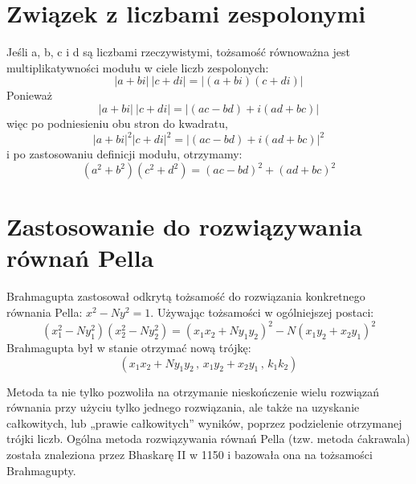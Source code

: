 \documentclass{article}
\begin{document}
\section*{Związek z liczbami zespolonymi}
Jeśli a, b, c i d są liczbami rzeczywistymi, tożsamość równoważna jest multiplikatywności modułu w ciele liczb zespolonych:
$$ |a+bi|\ |c+di|=|(a+bi)(c+di)| $$
Ponieważ
$$  |a+bi|\ |c+di|=|(ac-bd)+i(ad+bc)| $$
więc po podniesieniu obu stron do kwadratu,
$$ |a+bi|^{2}|c+di|^{2}=|(ac-bd)+i(ad+bc)|^{2} $$
i po zastosowaniu definicji modułu, otrzymamy: 
$$ (a^{2}+b^{2})(c^{2}+d^{2})=(ac-bd)^{2}+(ad+bc)^{2} $$

\section*{Zastosowanie do rozwiązywania równań Pella}
Brahmagupta zastosował odkrytą tożsamość do rozwiązania konkretnego równania Pella: $ x^{2}-Ny^{2}=1 $. Używając tożsamości w ogólniejszej postaci:
\[ (x_{1}^{2}-Ny_{1}^{2})(x_{2}^{2}-Ny_{2}^{2})=(x_{1}x_{2}+Ny_{1}y_{2})^{2}-N(x_{1}y_{2}+x_{2}y_{1})^{2} \]
Brahmagupta był w stanie otrzymać nową trójkę:
\[ (x_{1}x_{2}+Ny_{1}y_{2}\,,\,x_{1}y_{2}+x_{2}y_{1}\,,\,k_{1}k_{2}) \]

Metoda ta nie tylko pozwoliła na otrzymanie nieskończenie wielu rozwiązań równania przy użyciu tylko jednego rozwiązania, ale także na uzyskanie całkowitych, lub „prawie całkowitych” wyników, poprzez podzielenie otrzymanej trójki liczb. Ogólna metoda rozwiązywania równań Pella (tzw. metoda ćakrawala) została znaleziona przez Bhaskarę II w 1150 i bazowała ona na tożsamości Brahmagupty.
\end{document}
